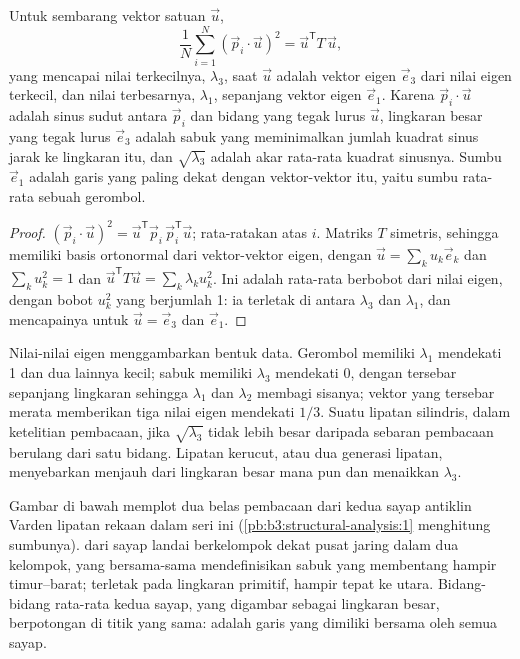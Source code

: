 \begin{theorem}\label{thm:b3:structural-analysis:tensor}
Untuk sembarang vektor satuan $\vec u$,
\[
  \frac1N\sum_{i=1}^N (\vec p_i\cdot\vec u)^2 = \vec u^{\mathsf T}T\,\vec u ,
\]
yang mencapai nilai terkecilnya, $\lambda_3$, saat $\vec u$ adalah vektor eigen
$\vec e_3$ dari nilai eigen terkecil, dan nilai terbesarnya, $\lambda_1$, sepanjang
vektor eigen $\vec e_1$. Karena $\vec p_i\cdot\vec u$ adalah sinus sudut
antara $\vec p_i$ dan bidang yang tegak lurus $\vec u$, lingkaran besar
yang tegak lurus $\vec e_3$ adalah sabuk yang meminimalkan jumlah kuadrat
sinus jarak  ke lingkaran itu, dan $\sqrt{\lambda_3}$ adalah
akar rata-rata kuadrat sinusnya. Sumbu $\vec e_1$ adalah garis yang paling dekat dengan
vektor-vektor itu, yaitu sumbu rata-rata sebuah gerombol.
\end{theorem}

\begin{proof}
$(\vec p_i\cdot\vec u)^2 = \vec u^{\mathsf T}\vec p_i\,\vec p_i^{\mathsf T}\vec
u$; rata-ratakan atas $i$. Matriks $T$ simetris, sehingga memiliki basis ortonormal
dari vektor-vektor eigen, dengan $\vec u = \sum_k u_k\vec e_k$ dan $\sum_k
u_k^2 = 1$ dan $\vec u^{\mathsf T}T\vec u = \sum_k\lambda_k u_k^2$. Ini adalah
rata-rata berbobot dari nilai eigen, dengan bobot $u_k^2$ yang berjumlah 1: ia
terletak di antara $\lambda_3$ dan $\lambda_1$, dan mencapainya untuk $\vec u = \vec
e_3$ dan $\vec e_1$.
\end{proof}

Nilai-nilai eigen menggambarkan bentuk data. Gerombol memiliki $\lambda_1$ mendekati
1 dan dua lainnya kecil; sabuk memiliki $\lambda_3$ mendekati 0, dengan 
tersebar sepanjang lingkaran sehingga $\lambda_1$ dan $\lambda_2$ membagi sisanya;
vektor yang tersebar merata memberikan tiga nilai eigen mendekati $1/3$. Suatu lipatan
silindris, dalam ketelitian pembacaan, jika $\sqrt{\lambda_3}$
tidak lebih besar daripada sebaran pembacaan berulang dari satu bidang. Lipatan kerucut,
atau dua generasi lipatan, menyebarkan  menjauh dari lingkaran besar mana pun
dan menaikkan $\lambda_3$.

Gambar di bawah memplot dua belas pembacaan dari kedua sayap antiklin Varden
lipatan rekaan dalam seri ini (\cref{pb:b3:structural-analysis:1}
menghitung sumbunya).  dari sayap landai berkelompok dekat pusat
jaring dalam dua kelompok, yang bersama-sama mendefinisikan sabuk yang membentang hampir
timur--barat;  terletak pada lingkaran primitif, hampir tepat ke utara. Bidang-bidang rata-rata
kedua sayap, yang digambar sebagai lingkaran besar, berpotongan di titik yang sama:
 adalah garis yang dimiliki bersama oleh semua sayap.

